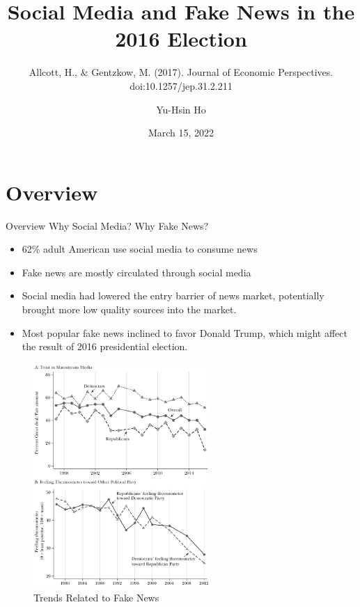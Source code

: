 \documentclass[
  10pt,
  ignorenonframetext,
  aspectratio=43,
]{beamer}
\title{Social Media and Fake News in the 2016 Election}
\subtitle{Allcott, H., \& Gentzkow, M. (2017). Journal of Economic
Perspectives. doi:10.1257/jep.31.2.211}
\author{Yu-Hsin Ho}
\date{March 15, 2022}
\institute{Department of Economics, National Taiwan University}
\providecommand{\tightlist}{%
  \setlength{\itemsep}{0pt}\setlength{\parskip}{0pt}}
\begin{document}
\frame{\titlepage}

\begin{frame}
  \tableofcontents[hideallsubsections]
\end{frame}
\hypertarget{overview}{%
\section{Overview}\label{overview}}

\begin{frame}{Overview}
Why Social Media? Why Fake News?

\begin{itemize}
\tightlist
\item
  62\% adult American use social media to consume news
\item
  Fake news are mostly circulated through social media
\item
  Social media had lowered the entry barrier of news market, potentially
  brought more low quality sources into the market.
\item
  Most popular fake news inclined to favor Donald Trump, which might
  affect the result of 2016 presidential election.
\end{itemize}
\end{frame}

\begin{frame}
\begin{figure}
\centering
\includegraphics[width=0.6\textwidth,height=\textheight]{20220315-allcott-gentzkow-2016-election-fake-news.assets/image-20220314191028856.png}
\caption{Trends Related to Fake News}
\end{figure}
\end{frame}
\end{document}
